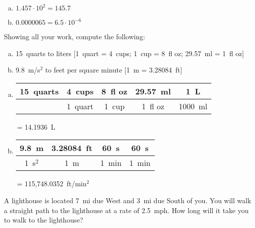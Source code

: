 \documentclass[12pt,letterpaper]{exam}
\begin{document}
\begin{questions}
\sol 
\begin{enumerate}[(a)]
\item $1.457 \cdot 10^2= 145.7$ \pspace
\item $0.0000065= 6.5 \cdot 10^{-6}$
\end{enumerate}



\newpage
\question[5] Showing all your work, compute the following:
	\begin{enumerate}[(a)]
	\item 15~quarts to liters [1~quart = 4~cups; 1~cup = 8~fl oz; 29.57~ml = 1~fl oz]
	\item 9.8~m/s$^2$ to feet per square minute [1~m = 3.28084~ft]
	\end{enumerate} \pspace

\sol 
\begin{enumerate}[(a)]
\item \phantom{.}\par
	\begin{table}[H]
	\centering
	\begin{tabular}{c||c|c|c|c}
	15~quarts & 4~cups & 8~fl oz & 29.57~ml & 1~L \\ \hline
			& 1~quart & 1~cup & 1~fl oz & 1000~ml
	\end{tabular}\,= 14.1936~L
	\end{table} \pspace

\item \phantom{.}\par
	\begin{table}[H]
	\centering
	\begin{tabular}{c||c|c|c}
	9.8~m & 3.28084~ft & 60~s & 60~s \\ \hline
	1~s$^2$ & 1~m & 1~min & 1~min
	\end{tabular}\,= 115,748.0352~ft/min$^2$
	\end{table} 
\end{enumerate}



\newpage
\question[5] A lighthouse is located 7~mi due West and 3~mi due South of you. You will walk a straight path to the lighthouse at a rate of 2.5~mph. How long will it take you to walk to the lighthouse? \pspace


\end{questions}
\end{document}
